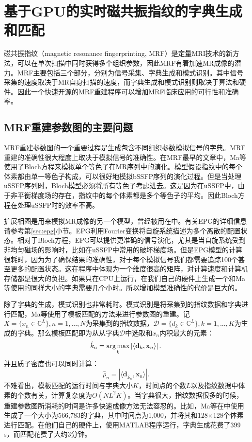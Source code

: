 \chapter{基于GPU的实时磁共振指纹的字典生成和匹配}
\label{chap:snapMRF}
磁共振指纹（magnetic resonance fingerprinting, MRF）是定量MRI技术的新方法，可以在单次扫描中同时获得多个组织参数\cite{mrf,esr,bipin_mehta_magnetic_2019}，因此MRF有着加速MR成像的潜力。MRF主要包括三个部分，分别为信号采集、字典生成和模式识别。其中信号采集的速度取决于MR自身扫描的速度，而字典生成和模式识别则取决于算法和硬件。因此一个快速开源的MRF重建程序可以增加MRF临床应用的可行性和准确率。

\section{MRF重建参数图的主要问题}
MRF重建参数图的一个重要过程是生成包含不同组织参数模拟信号的字典。MRF重建的准确性很大程度上取决于模拟信号的准确性。在MRF最早的文章中，Ma等\cite{mrf}使用了Bloch方程来模拟单个等色子在MR序列中的演化。模型假设指纹中的每个体素都由单一等色子构成，可以很好地模拟bSSFP序列的演化过程。但是当处理uSSFP序列时，Bloch模型必须将所有等色子考虑进去。这是因为在uSSFP中，由于非平衡梯度场的存在，指纹中的每个体素都是多个等色子的平均。因此Bloch方程在处理uSSFP时的效率不高。

扩展相图是用来模拟MR成像的另一个模型，曾经被用在\cite{jiang}中。有关EPG的详细信息请参考第\ref{sec:epg}小节。EPG利用Fourier变换将自旋系统描述为多个离散的配置状态。相对于Bloch方程，EPG可以提供更准确的信号演化，尤其是当自旋系统受到非均匀磁场的影响时，比如在uSSFP中常用的破坏梯度场。但是EPG模型的计算很耗时，因为为了确保结果的准确性，对于每个模拟信号我们都需要追踪100个甚至更多的配置状态。这在程序中体现为一个维度很高的矩阵，对计算速度和计算机存储都是很大的负担。如果只在CPU上运行，在我们自己的硬件上生成一个和Ma等\cite{mrf}使用的同样大小的字典需要几个小时。所以增加模型准确性的代价是巨大的。

除了字典的生成，模式识别也非常耗时。模式识别是将采集到的指纹数据和字典进行匹配，Ma等\cite{mrf}使用了模板匹配的方法来进行参数图的重建。记$X=\{x_n\in \mathbb{C}^L\}, n=1,...,N$为采集到的指纹数据，$\mathcal{D}=\{d_k\in \mathbb{C}^L\},k=1,...,K$为生成的字典。那么模板匹配即为从从字典$\mathcal{D}$中选取和$x_n$内积最大的元素：
	\begin{equation}
	\hat{k}_n = \operatorname*{arg\,max}_k \left|\left\langle \mathbf{d}_k,\mathbf{x}_n \right\rangle \right|.
	\end{equation}
并且质子密度也可以同时计算：
	\begin{equation}
	\hat{\rho}_n=\left|\langle \mathbf{d}_{\hat{k}_n},\mathbf{x}_n \rangle\right|.
	\end{equation}
不难看出，模板匹配的运行时间与字典大小$K$，时间点的个数$L$以及指纹数据中体素的个数有关，计算复杂度为$O(NL^2K)$。当字典很大，指纹数据很多的时候，重建参数图所消耗的时间是许多快速成像方法无法容忍的。比如，Ma等在\cite{mrf}中使用生成了一个大小为566,783的字典，其中时间点为1,000，并将其和128$\times$128个体素进行匹配。在他们自己的硬件上，使用MATLAB程序运行，字典生成花费了399 s，而匹配花费了大约3分钟。

